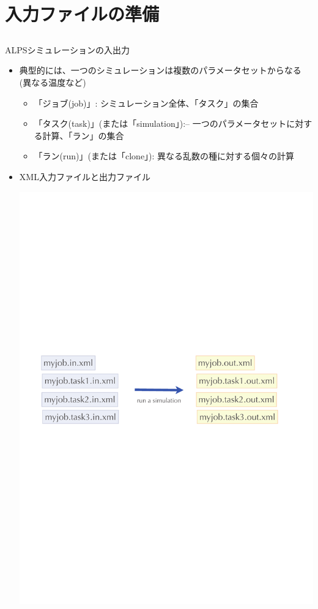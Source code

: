\section{入力ファイルの準備}

\subsection*{\redm\whiteb\greenb}
\begin{frame}{ALPSシミュレーションの入出力}
  \begin{itemize}
  \item 典型的には、一つのシミュレーションは複数のパラメータセットからなる(異なる温度など)
    \begin{itemize}
    \item 「ジョブ(job)」: シミュレーション全体、「タスク」の集合
    \item 「タスク(task)」(または「simulation」):– 一つのパラメータセットに対する計算、「ラン」の集合
    \item 「ラン(run)」(または「clone」): 異なる乱数の種に対する個々の計算
    \end{itemize}
  \item XML入力ファイルと出力ファイル
  \begin{center}
    \includegraphics[width=.55\textwidth]{simulation1.pdf}
  \end{center}
  \end{itemize}
\end{frame}

